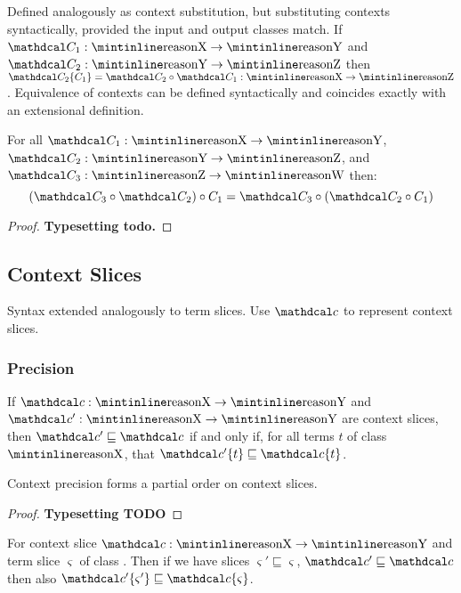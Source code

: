 \begin{definition}
Defined analogously as context substitution, but substituting contexts syntactically, provided the input and output classes match. If $\C_1 : \code{X} \to \code{Y}$ and $\C_2 : \code{Y} \to \code{Z}$ then $\C_2\{C_1\} = \C_2 \circ \C_1 : \code{X} \to \code{Z}$. Equivalence of contexts can be defined syntactically and coincides exactly with an extensional definition.
\end{definition}
\begin{proposition}
For all $\C_1 : \code{X} \to \code{Y}$, $\C_2 : \code{Y} \to \code{Z}$, and $\C_3 : \code{Z} \to \code{W}$ then:
\[(\C_3 \circ \C_2) \circ C_1 = \C_3 \circ (\C_2 \circ C_1)\]
\end{proposition}
\begin{proof}
\textbf{Typesetting todo.}
\end{proof}

\subsection{Context Slices}
Syntax extended analogously to term slices. Use $\Cs$ to represent context slices.

\subsubsection{Precision}
\begin{definition}\label{def:ContextPrecisionAppendix}
If $\Cs : \code{X} \to \code{Y}$ and $\Cs' : \code{X} \to \code{Y}$ are context slices, then $\Cs' \sqsubseteq \Cs$ if and only if, for all terms $t$ of class $\code{X}$, that $\Cs'\{t\} \sqsubseteq \Cs\{t\}$.
\end{definition}
\begin{proposition}
Context precision forms a partial order on context slices.
\end{proposition}
\begin{proof}
\textbf{Typesetting TODO}
\end{proof}
\begin{proposition}
For context slice $\Cs : \code{X} \to \code{Y}$ and term slice $\varsigma$ of class . Then if we have slices $\varsigma' \sqsubseteq \varsigma$, $\Cs' \sqsubseteq \Cs$ then also $\Cs'\{\varsigma'\} \sqsubseteq \Cs\{\varsigma\}$.
\end{proposition}

